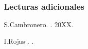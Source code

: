 \documentclass[utf8]{beamer}
\theoremstyle{plain}
\theoremstyle{definition}
\theoremstyle{remark}
\numberwithin{equation}{section}
\begin{document}
\begin{frame}[allowframebreaks]
  \frametitle<presentation>{Lecturas adicionales}
    
  \begin{thebibliography}{10}
    
  \beamertemplatebookbibitems

    S.Cambronero.
    .
    \newblock 20XX.

    I.Rojas
    .
    .
 
  \end{thebibliography}
  
\end{frame}
\end{document}
